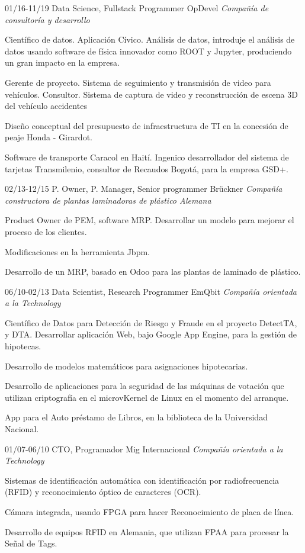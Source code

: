 \begin{entrylist}
  \entry
    {01/16-11/19}
    {Data Science, Fullstack Programmer}
    {OpDevel {\sl Compañía de consultoría y desarrollo}}
{Científico de datos. Aplicación Cívico. Análisis de datos, introduje el análisis de datos usando
software de física innovador como ROOT y Jupyter, produciendo un gran impacto en
la empresa.

Gerente de proyecto. Sistema de seguimiento y transmisión de video para vehículos.
Consultor. Sistema de captura de video y reconstrucción de escena 3D del vehículo
accidentes

Diseño conceptual del presupuesto de infraestructura de TI en la concesión de peaje Honda - Girardot.

Software de transporte Caracol en Haití. Ingenico desarrollador del sistema de tarjetas Transmilenio,
consultor de Recaudos Bogotá, para la empresa GSD+.}
  \entry
	{02/13-12/15}
	{P. Owner, P. Manager, Senior programmer}
	{Brückner {\sl Compañía constructora de plantas laminadoras de plástico Alemana}}
	{Product Owner de PEM, software MRP. Desarrollar un modelo para mejorar el proceso de los clientes.

Modificaciones en la herramienta Jbpm.

	Desarrollo de un MRP, basado en Odoo para las plantas de laminado de plástico.}

  \entry
	{06/10-02/13}
	{Data Scientist, Research Programmer}
	{EmQbit {\sl Compañía orientada a la Technology}}
	{Científico de Datos para Detección de Riesgo y Fraude en el proyecto DetectTA, y DTA.
Desarrollar aplicación Web, bajo Google App Engine, para la gestión de hipotecas.

Desarrollo de modelos matemáticos para asignaciones hipotecarias.

Desarrollo de aplicaciones para la seguridad de las máquinas de votación que utilizan criptografía
en el microvKernel de Linux en el momento del arranque.

App para el Auto préstamo de Libros, en la biblioteca de la Universidad Nacional.}

  \entry
	{01/07-06/10}
	{CTO, Programador}
	{Mig Internacional {\sl Compañía orientada a la Technology}}
	{Sistemas de identificación automática con identificación por radiofrecuencia (RFID)
y reconocimiento óptico de caracteres (OCR).

Cámara integrada, usando FPGA para hacer Reconocimiento de placa de línea.

Desarrollo de equipos RFID en Alemania, que utilizan FPAA para procesar la
Señal de Tags.}


\end{entrylist}
